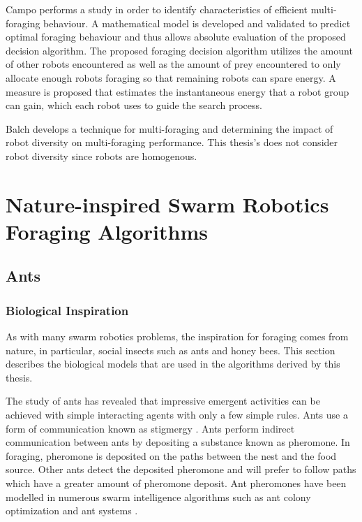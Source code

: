Campo \cite{campo2007efficient} performs a study in order to identify characteristics of efficient multi-foraging behaviour.  A mathematical model is developed and validated to predict optimal foraging behaviour and thus allows absolute evaluation of the proposed decision algorithm. The proposed foraging decision algorithm utilizes the amount of other robots encountered as well as the amount of prey encountered to only allocate enough robots foraging  so that remaining robots can spare energy. A measure is proposed that estimates the instantaneous energy that a robot group can gain, which each robot uses to guide the search process. 

Balch \cite{balch1999impact} develops a technique for multi-foraging and determining the impact of robot diversity on multi-foraging performance. This thesis's does not consider robot diversity since robots are homogenous.



\section{Nature-inspired Swarm Robotics Foraging Algorithms}
\subsection{Ants}
\label{sec:second:biological}

\subsubsection{Biological Inspiration}
\label{ants:biologicalinspiration}
As with many swarm robotics problems, the inspiration for foraging comes from nature, in particular, social insects such as ants and honey bees. This section describes the biological models that are used in the algorithms derived by this thesis. 

The study of ants has revealed that impressive emergent activities can be achieved with simple interacting agents with only a few simple rules. Ants use a form of communication known as stigmergy \cite{dorigo2000ant}. Ants perform indirect communication between ants by depositing a substance known as pheromone. In foraging, pheromone is deposited on the paths between the nest and the food source. Other ants detect the deposited pheromone and will prefer to follow paths which have a greater amount of pheromone deposit. Ant pheromones have been modelled in numerous swarm intelligence algorithms such as ant colony optimization and ant systems \cite{dorigo2006ant, dorigo2010ant}. 
 
